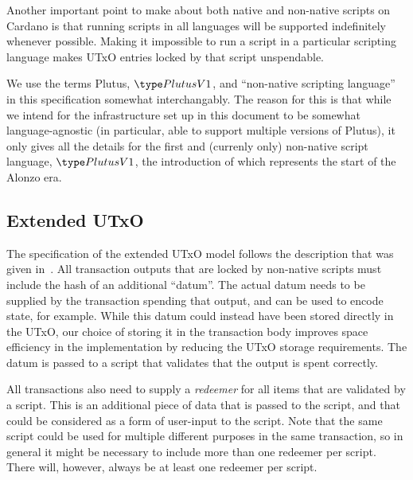 Another important point to make about both native and non-native scripts on Cardano is that
running scripts in all languages will be supported indefinitely whenever possible.
Making it impossible to run a script in a particular scripting language
makes UTxO entries locked by that script unspendable.

We use the terms Plutus, $\PlutusVI$, and ``non-native scripting language'' in this specification
somewhat interchangably. The reason for this is that while we intend for the infrastructure
set up in this document to be somewhat language-agnostic (in particular,
able to support multiple versions of Plutus), it only gives all the details for
the first and (currenly only) non-native script language, $\PlutusVI$,
the introduction of which represents the
start of the Alonzo era.


\subsection{Extended UTxO}

The specification of the extended UTxO model follows the description that was given in~\cite{plutus_eutxo}.
All transaction outputs that are locked by non-native scripts must include the hash of an additional ``datum''. The actual datum needs to be supplied by the transaction spending that output, and can be used to encode state, for example.
While this datum could instead have been stored directly in the UTxO, our choice of storing it in the transaction body improves space efficiency in the implementation by reducing the UTxO storage requirements. The datum is passed to a script that validates that the output is spent correctly.

All transactions also need to supply a \emph{redeemer} for all items that are validated by a script. This is an additional piece of data that is passed to the script, and that could be considered as a form of user-input to the script. Note that the same script could be used for multiple different purposes in the same transaction, so in general it might be necessary to include more than one redeemer per script.
There will, however, always be at least one redeemer per script.

